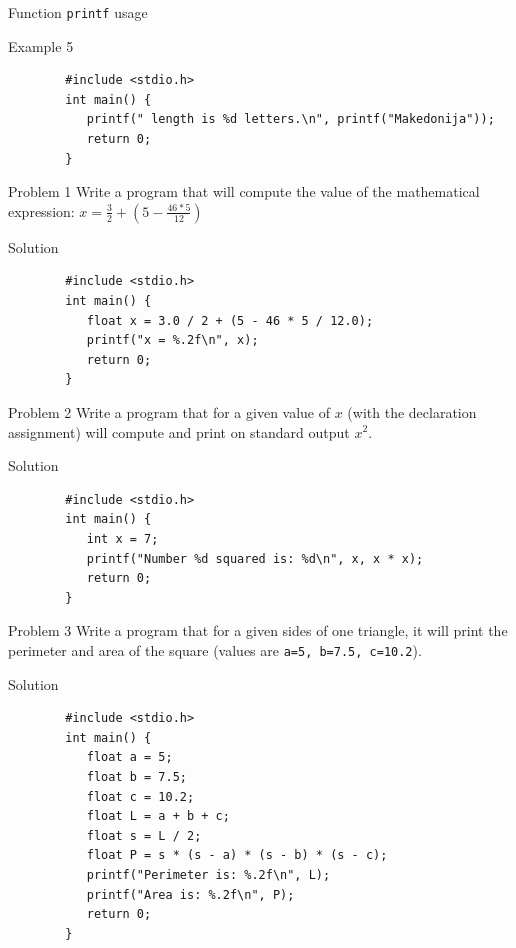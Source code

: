 \begin{frame}[fragile]{Function \texttt{printf} usage}
    \begin{exampleblock}{Example 5}
        \begin{lstlisting}
        #include <stdio.h>
        int main() {
           printf(" length is %d letters.\n", printf("Makedonija"));
           return 0;
        }
        \end{lstlisting}
    \end{exampleblock}
\end{frame}

\begin{frame}[fragile]{Problem 1}
    Write a program that will compute the value of the mathematical expression:
    $ x = \frac{3}{2} + (5 - \frac{46 * 5}{12})$
    \begin{exampleblock}{Solution}
        \begin{lstlisting}
        #include <stdio.h>
        int main() {
           float x = 3.0 / 2 + (5 - 46 * 5 / 12.0);
           printf("x = %.2f\n", x);
           return 0;
        }
        \end{lstlisting}
    \end{exampleblock}
\end{frame}

\begin{frame}[fragile]{Problem 2}
Write a program that for a given value of $ x $ (with the declaration
assignment) will compute and print on standard output $ x^2 $.
    \begin{exampleblock}{Solution}
        \begin{lstlisting}
        #include <stdio.h>
        int main() {
           int x = 7;
           printf("Number %d squared is: %d\n", x, x * x);
           return 0;
        }
        \end{lstlisting}
    \end{exampleblock}
\end{frame}

\begin{frame}[fragile]{Problem 3}
Write a program that for a given sides of one triangle, it will print the
perimeter and area of the square (values are \texttt{a=5, b=7.5,
c=10.2}).
    \begin{exampleblock}{Solution}
        \begin{lstlisting}
        #include <stdio.h>
        int main() {
           float a = 5;
           float b = 7.5;
           float c = 10.2;
           float L = a + b + c;
           float s = L / 2;
           float P = s * (s - a) * (s - b) * (s - c);
           printf("Perimeter is: %.2f\n", L);
           printf("Area is: %.2f\n", P);
           return 0;
        }
        \end{lstlisting}
    \end{exampleblock}
\end{frame}

